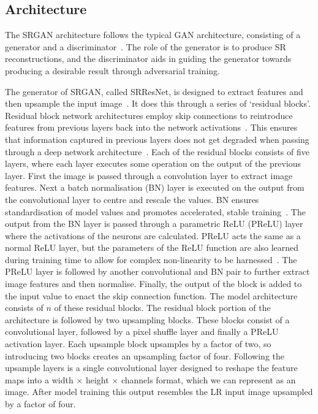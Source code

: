 \subsection{Architecture}\label{subsec:architecture}
The SRGAN architecture follows the typical GAN architecture, consisting of a generator and a discriminator~\cite{srgan,gan}. The role of the generator is to produce SR reconstructions, and the discriminator aids in guiding the generator towards producing a desirable result through adversarial training.

The generator of SRGAN, called SRResNet, is designed to extract features and then upsample the input image~\cite{srgan}. It does this through a series of `residual blocks'. Residual block network architectures employ skip connections to reintroduce features from previous layers back into the network activations~\cite{residualNets}. This ensures that information captured in previous layers does not get degraded when passing through a deep network architecture~\cite{residualNets}. Each of the residual blocks consists of five layers, where each layer executes some operation on the output of the previous layer. First the image is passed through a convolution layer to extract image features. Next a batch normalisation (BN) layer is executed on the output from the convolutional layer to centre and rescale the values. BN ensures standardisation of model values and promotes accelerated, stable training~\cite{batchNorm}. The output from the BN layer is passed through a parametric ReLU (PReLU) layer where the activations of the neurons are calculated. PReLU acts the same as a normal ReLU layer, but the parameters of the ReLU function are also learned during training time to allow for complex non-linearity to be harnessed~\cite{prelu}. The PReLU layer is followed by another convolutional and BN pair to further extract image features and then normalise. Finally, the output of the block is added to the input value to enact the skip connection function. The model architecture consists of $n$ of these residual blocks. The residual block portion of the architecture is followed by two upsampling blocks. These blocks consist of a convolutional layer, followed by a pixel shuffle layer and finally a PReLU activation layer. Each upsample block upsamples by a factor of two, so introducing two blocks creates an upsampling factor of four. Following the upsample layers is a single convolutional layer designed to reshape the feature maps into a width $\times$ height $\times$ channels format, which we can represent as an image. After model training this output resembles the LR input image upsampled by a factor of four.

